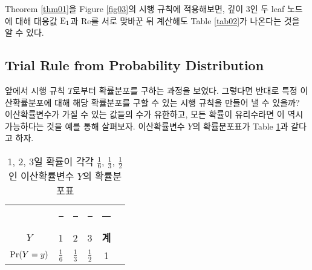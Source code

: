 \documentclass[11pt]{article}
\begin{document}
Theorem \ref{thm01}을 Figure \ref{fig03}의 시행 규칙에 적용해보면, 깊이 3인 두 leaf 노드에 대해 대응값 $\textnormal{E}_{1}$과 Re를 서로 맞바꾼 뒤 계산해도 Table \ref{tab02}가 나온다는 것을 알 수 있다.

\subsection{Trial Rule from Probability Distribution} \label{subsection3-2}
앞에서 시행 규칙 $T$로부터 확률분포를 구하는 과정을 보였다. 그렇다면 반대로 특정 이산확률분포에 대해 해당 확률분포를 구할 수 있는 시행 규칙을 만들어 낼 수 있을까? 이산확률변수가 가질 수 있는 값들의 수가 유한하고, 모든 확률이 유리수라면 이 역시 가능하다는 것을 예를 통해 살펴보자. 이산확률변수 $Y$의 확률분포표가 Table \ref{tab03}과 같다고 하자.
\begin{table}[h]
\centering
\begin{tabular}{cccccc}
\toprule
 & \rule{0.8cm}{0pt} & \rule{0.3cm}{0pt} & \rule{0.8cm}{0pt} & \rule{0.4cm}{0pt} \\[-\arraystretch\normalbaselineskip]
$Y$ & 1 & 2 & 3 & \textbf{계} \\
\midrule
$\textnormal{Pr}(Y=y)$ & $\displaystyle \frac{1}{6}$ & $\displaystyle \frac{1}{3}$ & $\displaystyle \frac{1}{2}$ & 1 \\
\bottomrule
\end{tabular}
\caption{1, 2, 3일 확률이 각각 $\frac{1}{6}$, $\frac{1}{3}$, $\frac{1}{2}$인 이산확률변수 $Y$의 확률분포표}
\label{tab03}
\end{table}
\end{document}
